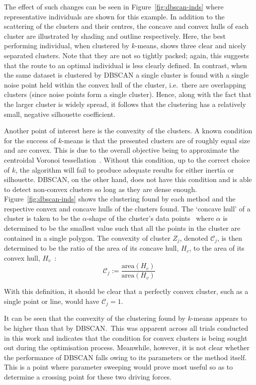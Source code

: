 The effect of such changes can be seen in Figure~\ref{fig:dbscan-inds} where
representative individuals are shown for this example. In addition to the
scattering of the clusters and their centres, the concave and convex hulls of
each cluster are illustrated by shading and outline respectively. Here, the best
performing individual, when clustered by \(k\)-means, shows three clear and
nicely separated clusters. Note that they are not so tightly packed; again, this
suggests that the route to an optimal individual is less clearly defined. In
contrast, when the same dataset is clustered by DBSCAN a single cluster is found
with a single noise point held within the convex hull of the cluster, i.e.\
there are overlapping clusters (since noise points form a single cluster).
Hence, along with the fact that the larger cluster is widely spread, it follows
that the clustering has a relatively small, negative silhouette coefficient.

Another point of interest here is the convexity of the clusters. A known
condition for the success of \(k\)-means is that the presented clusters are of
roughly equal size and are convex. This is due to the overall objective being to
approximate the centroidal Voronoi tessellation~\cite{Du2006}. Without this
condition, up to the correct choice of \(k\), the algorithm will fail to produce
adequate results for either inertia or silhouette. DBSCAN, on the other hand,
does not have this condition and is able to detect non-convex clusters so long
as they are dense enough. Figure~\ref{fig:dbscan-inds} shows the clustering
found by each method and the respective convex and concave hulls of the clusters
found. The `concave hull' of a cluster is taken to be the \(\alpha\)-shape of
the cluster's data points~\cite{Edelsbrunner1983} where \(\alpha\) is determined
to be the smallest value such that all the points in the cluster are contained
in a single polygon. The convexity of cluster \(Z_j\), denoted
\(\mathcal{C}_j\), is then determined to be the ratio of the area of its concave
hull, \(H_c\), to the area of its convex hull, \(H_v\)~\cite{Sonka1993}:
\begin{equation}
    \mathcal{C}_j :=
    \frac{\text{area}\left(H_c\right)}{\text{area}\left(H_v\right)}
\end{equation}

With this definition, it should be clear that a perfectly convex cluster, such
as a single point or line, would have \(\mathcal{C}_j = 1\).

It can be seen that the convexity of the clustering found by \(k\)-means appears
to be higher than that by DBSCAN.\ This was apparent across all trials conducted
in this work and indicates that the condition for convex clusters is being
sought out during the optimisation process. Meanwhile, however, it is not clear
whether the performance of DBSCAN falls owing to its parameters or the method
itself. This is a point where parameter sweeping would prove most useful so as
to determine a crossing point for these two driving forces.

